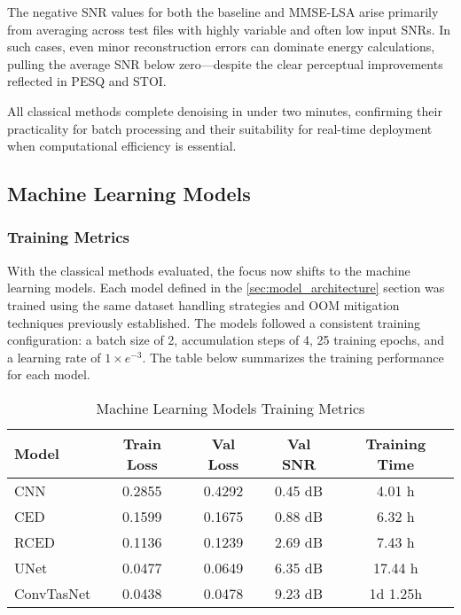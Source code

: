 The negative SNR values for both the baseline and MMSE-LSA arise primarily from averaging across test files with highly variable and often low input SNRs. In such cases, even minor reconstruction errors can dominate energy calculations, pulling the average SNR below zero—despite the clear perceptual improvements reflected in PESQ and STOI.

All classical methods complete denoising in under two minutes, confirming their practicality for batch processing and their suitability for real-time deployment when computational efficiency is essential.

\subsection{Machine Learning Models}
\label{sec:ml_models}

\subsubsection{Training Metrics}
\label{sec:training_metrics}

With the classical methods evaluated, the focus now shifts to the machine learning models. Each model defined in the \ref{sec:model_architecture} section was trained using the same dataset handling strategies and OOM mitigation techniques previously established. The models followed a consistent training configuration: a batch size of 2, accumulation steps of 4, 25 training epochs, and a learning rate of $1 \times e^{-3}$. The table below summarizes the training performance for each model.

\vspace{1em}
\begin{table}[H]
\centering
\caption{Machine Learning Models Training Metrics}
\label{tab:ml_training}
\begin{tabular}{|l|c|c|c|c|}
\hline
\textbf{Model} & \textbf{Train Loss} & \textbf{Val Loss} & \textbf{Val SNR} & \textbf{Training Time} \\
\hline
CNN         & 0.2855 & 0.4292 & 0.45 dB & 4.01 h \\
CED         & 0.1599 & 0.1675 & 0.88 dB & 6.32 h \\
RCED        & 0.1136 & 0.1239 & 2.69 dB & 7.43 h \\
UNet        & 0.0477 & 0.0649 & 6.35 dB & 17.44 h \\
ConvTasNet  & 0.0438 & 0.0478 & 9.23 dB & 1d 1.25h \\
\hline
\end{tabular}
\end{table}

